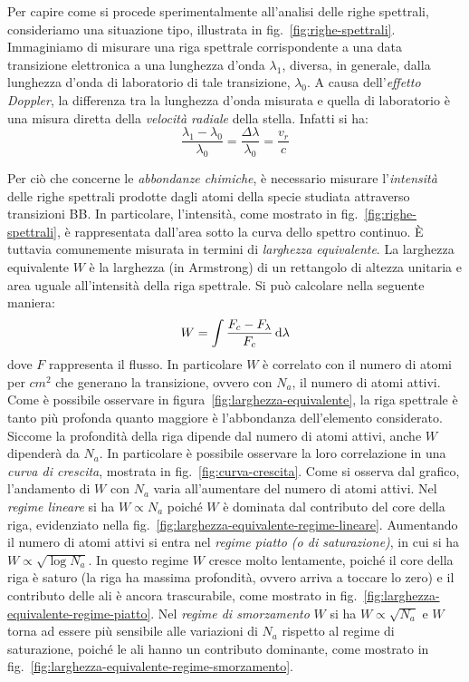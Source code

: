 Per capire come si procede sperimentalmente all'analisi delle righe spettrali, consideriamo una situazione tipo, illustrata in fig.~\ref{fig:righe-spettrali}. Immaginiamo di misurare una riga spettrale corrispondente a una data transizione elettronica a una lunghezza d'onda $\lambda_1$, diversa, in generale, dalla lunghezza d'onda di laboratorio di tale transizione, $\lambda_0$. A causa dell'\emph{effetto Doppler}, la differenza tra la lunghezza d'onda misurata e quella di laboratorio è una misura diretta della \emph{velocità radiale} della stella. Infatti si ha:
\begin{equation}\label{eq:effetto-doppler}
    \dfrac{\lambda_1 - \lambda_0}{\lambda_0} = \dfrac{\Delta \lambda}{\lambda_0} = \dfrac{v_r}{c}
\end{equation}

Per ciò che concerne le \emph{abbondanze chimiche}, è necessario misurare l'\emph{intensità} delle righe spettrali prodotte dagli atomi della specie studiata attraverso transizioni BB. In particolare, l'intensità, come mostrato in fig.~\ref{fig:righe-spettrali}, è rappresentata dall'area sotto la curva dello spettro continuo. È tuttavia comunemente misurata in termini di \emph{larghezza equivalente}. La larghezza equivalente $W$ è la larghezza (in Armstrong) di un rettangolo di altezza unitaria e area uguale all'intensità della riga spettrale. Si può calcolare nella seguente maniera:
\begin{equation}\label{eq:larghezza-equivalente}
    W = \int \dfrac{F_c - F_\lambda}{F_c} \mathop{}\!\mathrm{d} \lambda
\end{equation} 
dove $F$ rappresenta il flusso. In particolare $W$ è correlato con il numero di atomi per $\si{cm^2}$ che generano la transizione, ovvero con $N_a$, il numero di atomi attivi. Come è possibile osservare in figura~\ref{fig:larghezza-equivalente}, la riga spettrale è tanto più profonda quanto maggiore è l'abbondanza dell'elemento considerato. Siccome la profondità della riga dipende dal numero di atomi attivi, anche $W$ dipenderà da $N_a$. In particolare è possibile osservare la loro correlazione in una \emph{curva di crescita}, mostrata in fig.~\ref{fig:curva-crescita}. Come si osserva dal grafico, l'andamento di $W$ con $N_a$ varia all'aumentare del numero di atomi attivi. Nel \emph{regime lineare} si ha $W \propto N_a$ poiché $W$ è dominata dal contributo del core della riga, evidenziato nella fig.~\ref{fig:larghezza-equivalente-regime-lineare}. Aumentando il numero di atomi attivi si entra nel \emph{regime piatto (o di saturazione)}, in cui si ha $W \propto \sqrt{\log N_a}$. In questo regime $W$ cresce molto lentamente, poiché il core della riga è saturo (la riga ha massima profondità, ovvero arriva a toccare lo zero) e il contributo delle ali è ancora trascurabile, come mostrato in fig.~\ref{fig:larghezza-equivalente-regime-piatto}. Nel \emph{regime di smorzamento} $W$ si ha $W \propto \sqrt{N_a}$ e $W$ torna ad essere più sensibile alle variazioni di $N_a$ rispetto al regime di saturazione, poiché le ali hanno un contributo dominante, come mostrato in fig.~\ref{fig:larghezza-equivalente-regime-smorzamento}.

